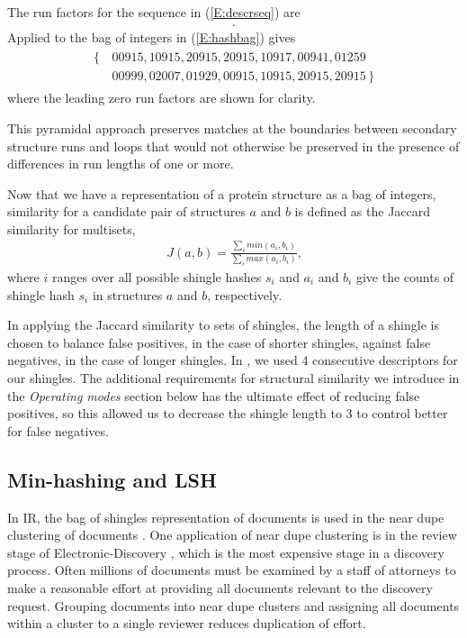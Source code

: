 \documentclass[10pt,letterpaper]{article}
\begin{document}
The run factors for the sequence in (\ref{E:descrseq}) are
\begin{align}
    [\, 0, 1, 2, 2, 1, 0, 0, 0, 0, 0, 0, 1, 2, 2, 1, 0 \,].
\end{align}
Applied to the bag of integers in (\ref{E:hashbag}) gives
\begin{align}\label{E:rpebag}
    \begin{split}
    \{\,&00915, 10915, 20915, 20915, 10917, 00941, 01259 \\
        &00999, 02007, 01929, 00915, 10915, 20915, 20915 \,\}
    \end{split}
\end{align}
where the leading zero run factors are shown for clarity. 

This pyramidal approach preserves matches at the boundaries between secondary structure runs and loops that would not otherwise be preserved in the presence of differences in run lengths of one or more. 

Now that we have a representation of a protein structure as a bag of integers, similarity for a candidate pair of structures $a$ and $b$ is defined as the Jaccard similarity \cite{Levan1971} for multisets,
\begin{align}
    J(a,b) = \frac{\sum_i min(a_i, b_i)}{\sum_i max(a_i,b_i)}\text{,}
\end{align}
where $i$ ranges over all possible shingle hashes $s_i$ and $a_i$ and $b_i$ give the counts of shingle hash $s_i$ in structures $a$ and $b$, respectively. 

In applying the Jaccard similarity to sets of shingles, the length of a shingle is chosen to balance false positives, in the case of shorter shingles, against false negatives, in the case of longer shingles.
In \cite{Ayoub2017}, we used 4 consecutive descriptors for our shingles. 
The additional requirements for structural similarity we introduce in the \emph{Operating modes} section below has the ultimate effect of reducing false positives, so this allowed us to decrease the shingle length to 3 to control better for false negatives. 

\subsection*{Min-hashing and LSH}

In IR, the bag of shingles representation of documents is used in the near dupe clustering of documents \cite{Broder1997b}.
One application of near dupe clustering is in the review stage of Electronic-Discovery \cite{Joshi2008}, which is the most expensive stage in a discovery process. 
Often millions of documents must be examined by a staff of attorneys to make a reasonable effort at providing all documents relevant to the discovery request. 
Grouping documents into near dupe clusters and assigning all documents within a cluster to a single reviewer reduces duplication of effort. 
\end{document}
